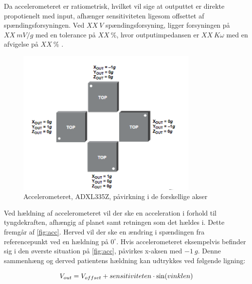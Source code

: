 Da accelerometeret er ratiometrisk, hvilket vil sige at outputtet er direkte propotienelt med input, afhænger sensitiviteten ligesom offsettet af spændingsforsyningen. Ved $XX~V$ spændingsforsyning, ligger forsyningen på $XX~mV/g$ med en tolerance på $XX~\%$, hvor outputimpedansen er $XX~K\omega$ med en afvigelse på $XX~\%$ \citep{analogdevices2010}. 

\begin{figure}[H]
\centering
\includegraphics[width=0.8\textwidth]{figures/acc.png}
\caption{Accelerometeret, ADXL335Z, påvirkning i de forskellige akser}
\label{fig:acc}
\end{figure}

\noindent
Ved hældning af accelerometeret vil der ske en acceleration i forhold til tyngdekraften, afhængig af planet samt retningen som det hældes i. Dette fremgår af \autoref{fig:acc}. Herved vil der ske en ændring i spændingen fra referencepunkt ved en hældning på $0^{\circ}$. Hvis accelerometeret eksempelvis befinder sig i den øverste situation på \autoref{fig:acc}, påvirkes x-aksen med $-1~g$. Denne sammenhæng og derved patientens hældning kan udtrykkes ved følgende ligning:

\begin{equation}
	V_{out} = V_{offset} + sensitiviteten \cdot \sin(vinklen) \\
\end{equation}


